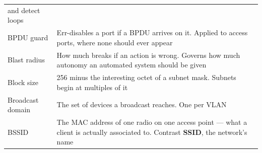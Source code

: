 \begin{longtable}{@{}L{4.0cm}L{11.6cm}@{}}
and detect loops \\
BPDU guard & Err-disables a port if a BPDU arrives on it. Applied to access ports,
where none should ever appear \\
Blast radius & How much breaks if an action is wrong. Governs how much autonomy
an automated system should be given \\
Block size & 256 minus the interesting octet of a subnet mask. Subnets begin at
multiples of it \\
Broadcast domain & The set of devices a broadcast reaches. One per VLAN \\
BSSID & The MAC address of one radio on one access point --- what a client is
actually associated to. Contrast \textbf{SSID}, the network's name \\


\end{longtable}

